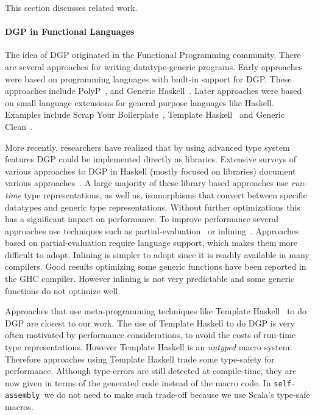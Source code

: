 \documentclass[preprint,nocopyrightspace]{sigplanconf}
\newcommand{\selfassembly}{\texttt{self-assembly~}}
\begin{document}
This section discusses related work.


\paragraph{DGP in Functional Languages}
The idea of DGP originated in the Functional Programming community.
There are several approaches for writing datatype-generic
programs. Early approaches were based on programming languages with
built-in support for DGP. These approaches include PolyP~\cite{PolyPJansson},
and Generic Haskell~\cite{GenericHaskell}. Later approaches were
based on small language extensions for general purpose languages like
Haskell. Examples include Scrap Your Boilerplate~\cite{SYB}, Template
Haskell~\cite{template-haskell} and Generic Clean~\cite{GenericClean}.

More recently, researchers have realized that by using advanced type
system features DGP could be implemented directly as
libraries. Extensive surveys of various approaches to DGP in Haskell
(mostly focused on libraries) document various
approaches~\cite{ComparingGPHaskellRodriquez,ComparingGPHaskellHinze}. A
large majority of these library based approaches use \emph{run-time}
type representations, as well as, isomorphisms that convert between
specific datatypes and generic type representations. Without further
optimizations this has a significant impact on performance. To improve
performance several approaches use techniques such as
partial-evaluation~\cite{DGPPartial} or inlining~\cite{OptimizingDGP}.
Approaches based on partial-evaluation require language support, which
makes them more difficult to adopt. Inlining is simpler to adopt since
it is readily available in many compilers.  Good results optimizing
some generic functions have been reported in the GHC compiler. However
inlining is not very predictable and some generic functions do not
optimize well.

Approaches that use meta-programming techniques like Template
Haskell~\cite{TemplateYourBoilerplate} to do DGP are closest to our work.
The use of Template Haskell to do
DGP is very often motivated by performance considerations, to avoid the
costs of run-time type representations. However Template Haskell is an
\emph{untyped} macro system. Therefore approaches using Template
Haskell trade some type-safety for performance. Although type-errors
are still detected at compile-time, they are now given in terms of the
generated code instead of the macro code. In \selfassembly we do not
need to make such trade-off because we use Scala's type-safe macros.
\end{document}
